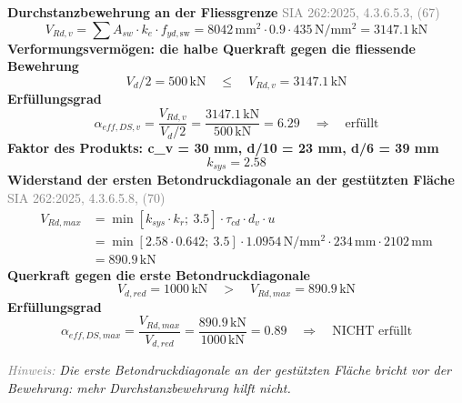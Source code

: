 \documentclass[11pt,a4paper]{article}
\newcommand{\normref}[1]{{\small\textcolor{gray}{#1}}}
\newcommand{\hinweis}[2]{\par\noindent\textcolor{gray}{\textit{#1:}} \textit{#2}\par}
\begin{document}
\noindent\textbf{Durchstanzbewehrung an der Fliessgrenze} \hfill \normref{SIA 262:2025, 4.3.6.5.3, (67)}
\begin{equation*}
V_{Rd,v} = \sum A_{sw} \cdot k_e \cdot f_{yd,\text{sw}} = 8042\,\mathrm{mm}^{2} \cdot 0.9 \cdot 435\,\mathrm{N}/\mathrm{mm}^{2} = 3147.1\,\mathrm{kN}
\end{equation*}
\noindent\textbf{Verformungsvermögen: die halbe Querkraft gegen die fliessende Bewehrung}
\begin{equation*}
V_d / 2 = 500\,\mathrm{kN} \quad \le \quad V_{Rd,v} = 3147.1\,\mathrm{kN}
\end{equation*}
\noindent\textbf{Erfüllungsgrad}
\begin{equation*}
\alpha_{eff,DS,v} = \frac{V_{Rd,v}}{V_d / 2} = \frac{3147.1\,\mathrm{kN}}{500\,\mathrm{kN}} = 6.29 \quad \Rightarrow \quad \text{erfüllt}
\end{equation*}
\noindent\textbf{Faktor des Produkts: c\_v = 30 mm, d/10 = 23 mm, d/6 = 39 mm}
\begin{equation*}
k_{sys} = 2.58
\end{equation*}
\noindent\textbf{Widerstand der ersten Betondruckdiagonale an der gestützten Fläche} \hfill \normref{SIA 262:2025, 4.3.6.5.8, (70)}
\begin{equation*}
\begin{aligned}
  V_{Rd,max} &= \min\left[k_{sys} \cdot k_r;\ 3.5\right] \cdot \tau_{cd} \cdot d_v \cdot u \\
  &= \min\left[2.58 \cdot 0.642;\ 3.5\right] \cdot 1.0954\,\mathrm{N}/\mathrm{mm}^{2} \cdot 234\,\mathrm{mm} \cdot 2102\,\mathrm{mm} \\
  &= 890.9\,\mathrm{kN}
\end{aligned}
\end{equation*}
\noindent\textbf{Querkraft gegen die erste Betondruckdiagonale}
\begin{equation*}
V_{d,red} = 1000\,\mathrm{kN} \quad > \quad V_{Rd,max} = 890.9\,\mathrm{kN}
\end{equation*}
\noindent\textbf{Erfüllungsgrad}
\begin{equation*}
\alpha_{eff,DS,max} = \frac{V_{Rd,max}}{V_{d,red}} = \frac{890.9\,\mathrm{kN}}{1000\,\mathrm{kN}} = 0.89 \quad \Rightarrow \quad \text{NICHT erfüllt}
\end{equation*}
\hinweis{Hinweis}{Die erste Betondruckdiagonale an der gestützten Fläche bricht vor der Bewehrung: mehr Durchstanzbewehrung hilft nicht.}
\end{document}

